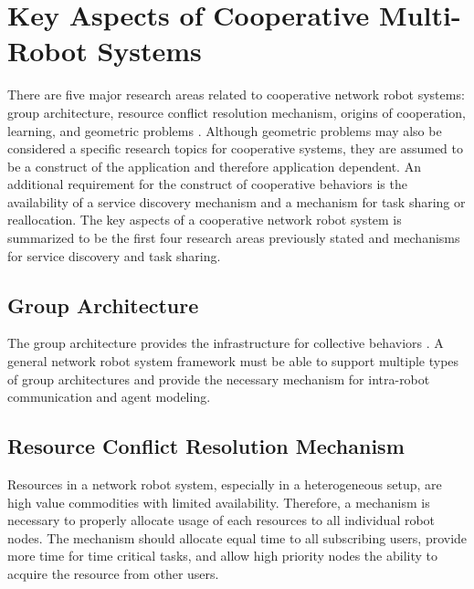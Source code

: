   \section{Key Aspects of Cooperative Multi-Robot Systems}

    There are five major research areas related to cooperative network robot 
      systems: group architecture, resource conflict resolution mechanism, 
      origins of cooperation, learning, and geometric problems \cite{Cao1997}.
    Although geometric problems may also be considered a specific research 
      topics for cooperative systems, they are assumed to be a construct of the 
      application and therefore application dependent.
    An additional requirement for the construct of cooperative behaviors is the 
      availability of a service discovery mechanism and a mechanism for task 
      sharing or reallocation.
    The key aspects of a cooperative network robot system is summarized to be 
      the first four research areas previously stated and mechanisms for service 
      discovery and task sharing.

    \subsection{Group Architecture}
      The group architecture provides the infrastructure for collective
        behaviors \cite{Cao1997}.
      A general network robot system framework must be able to support
        multiple types of group architectures and provide the necessary
        mechanism for intra-robot communication and agent modeling.

    \subsection{Resource Conflict Resolution Mechanism}
      Resources in a network robot system, especially in a heterogeneous setup,
        are high value commodities with limited availability.
      Therefore, a mechanism is necessary to properly allocate usage of each
        resources to all individual robot nodes.
      The mechanism should allocate equal time to all subscribing users,
        provide more time for time critical tasks, and allow high priority
        nodes the ability to acquire the resource from other users.

